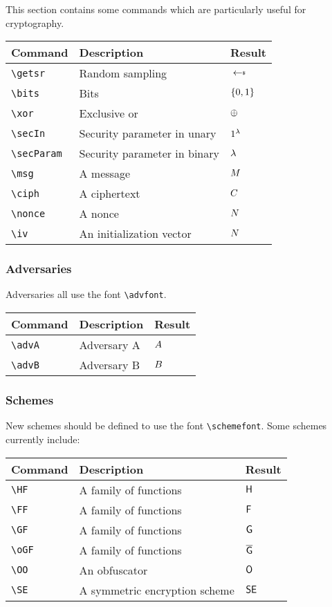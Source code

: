 \documentclass[11pt,twoside]{report}
\begin{document}
This section contains some commands which are particularly useful for cryptography.
\begin{center}
\begin{tabular}{l l l}
	\textbf{Command} & \textbf{Description} & \textbf{Result} \\\hline
	\lstinline$\getsr$ & Random sampling & $\getsr$  \\
	\lstinline$\bits$ & Bits & $\{0,1\}$  \\
	\lstinline$\xor$ & Exclusive or & ${\oplus}$  \\
	\lstinline$\secIn$ & Security parameter in unary & $1^\lambda$  \\
	\lstinline$\secParam$ & Security parameter in binary & $\lambda$  \\
	\lstinline$\msg$ & A message & $M$  \\
	\lstinline$\ciph$ & A ciphertext & $C$  \\
	\lstinline$\nonce$ & A nonce & $N$  \\
	\lstinline$\iv$ & An initialization vector & $N$  
\end{tabular}
\end{center}

\subsubsection{Adversaries}
Adversaries all use the font \lstinline$\advfont$.
\begin{center}
\begin{tabular}{l l l}
	\textbf{Command} & \textbf{Description} & \textbf{Result} \\\hline
	\lstinline$\advA$ & Adversary A & $A$  \\
	\lstinline$\advB$ & Adversary B & $B$ 
\end{tabular}
\end{center}

\subsubsection{Schemes}
New schemes should be defined to use the font \lstinline$\schemefont$.
Some schemes currently include:
\begin{center}
\begin{tabular}{l l l}
	\textbf{Command} & \textbf{Description} & \textbf{Result} \\\hline
	\lstinline$\HF$ & A family of functions & $\mathsf{H}$  \\
	\lstinline$\FF$ & A family of functions & $\mathsf{F}$  \\
	\lstinline$\GF$ & A family of functions & $\mathsf{G}$  \\
	\lstinline$\oGF$ & A family of functions & $\overline{\mathsf{G}}$  \\
	\lstinline$\OO$ & An obfuscator & $\mathsf{O}$  \\
	\lstinline$\SE$ & A symmetric encryption scheme & $\mathsf{SE}$
\end{tabular}
\end{center}
\end{document}
